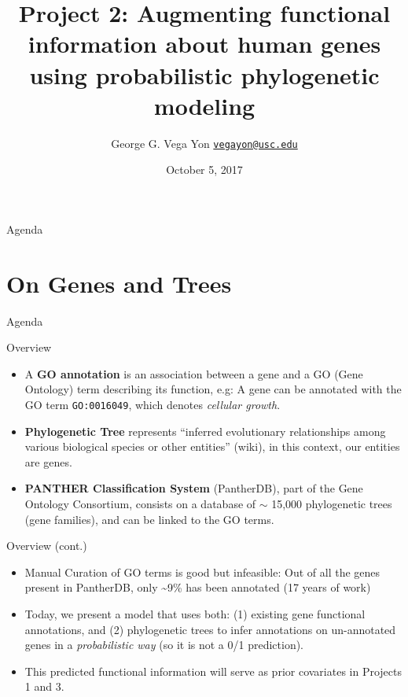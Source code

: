 \documentclass[9pt,ignorenonframetext,]{beamer}
\title{Project 2: Augmenting functional information about human genes using
probabilistic phylogenetic modeling}
\author[
Vega Yon
]{George G. Vega Yon
\linebreak[4] \href{mailto:vegayon@usc.edu}{\nolinkurl{vegayon@usc.edu}}}
\institute[USC]{Department of Preventive Medicine \and University of Southern California}
\date{October 5, 2017}
\begin{document}

\begin{frame}{Agenda}

\tableofcontents{}

\end{frame}

\section{On Genes and Trees}\label{on-genes-and-trees}

\begin{frame}{Agenda}

\tableofcontents[currentsection]

\end{frame}

\begin{frame}[fragile]{Overview}

\begin{itemize}
\item
  A \textbf{GO annotation} is an association between a gene and a GO
  (Gene Ontology) term describing its function, e.g: A gene can be
  annotated with the GO term \texttt{GO:0016049}, which denotes
  \emph{cellular growth}.\pause
\item
  \textbf{Phylogenetic Tree} represents ``inferred evolutionary
  relationships among various biological species or other entities''
  (wiki), in this context, our entities are genes.\pause
\item
  \textbf{PANTHER Classification System} (PantherDB), part of the Gene
  Ontology Consortium, consists on a database of \(\sim\) 15,000
  phylogenetic trees (gene families), and can be linked to the GO
  terms.\pause
\end{itemize}

\end{frame}

\begin{frame}{Overview (cont.)}

\begin{itemize}
\item
  Manual Curation of GO terms is good but infeasible: \pause Out of all
  the genes present in PantherDB, only \textasciitilde{}9\% has been
  annotated (17 years of work)\pause
\item
  Today, we present a model that uses both: (1) existing gene functional
  annotations, and (2) phylogenetic trees to infer annotations on
  un-annotated genes in a \emph{probabilistic way} (so it is not a 0/1
  prediction).
\item
  This predicted functional information will serve as prior covariates
  in Projects 1 and 3. \pause
\end{itemize}

\end{frame}
\end{document}
